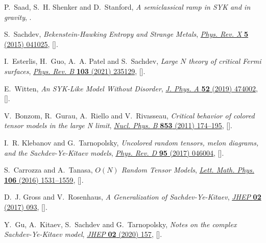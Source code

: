 \begin{thebibliography}{10}
P.~Saad, S.~H. Shenker and D.~Stanford, \emph{{A semiclassical ramp in SYK and
  in gravity}},  \href{https://arxiv.org/abs/1806.06840}{{}}.

S.~Sachdev, \emph{{Bekenstein-Hawking Entropy and Strange Metals}},
  \href{http://dx.doi.org/10.1103/PhysRevX.5.041025}{\emph{Phys. Rev. X}
  {\bfseries 5} (2015) 041025},
  [\href{https://arxiv.org/abs/1506.05111}{{}}].

I.~Esterlis, H.~Guo, A.~A. Patel and S.~Sachdev, \emph{{Large $N$ theory of
  critical Fermi surfaces}},
  \href{http://dx.doi.org/10.1103/PhysRevB.103.235129}{\emph{Phys. Rev. B}
  {\bfseries 103} (2021) 235129},
  [\href{https://arxiv.org/abs/2103.08615}{{}}].

E.~Witten, \emph{{An SYK-Like Model Without Disorder}},
  \href{http://dx.doi.org/10.1088/1751-8121/ab3752}{\emph{J. Phys. A}
  {\bfseries 52} (2019) 474002},
  [\href{https://arxiv.org/abs/1610.09758}{{}}].

V.~Bonzom, R.~Gurau, A.~Riello and V.~Rivasseau, \emph{{Critical behavior of
  colored tensor models in the large N limit}},
  \href{http://dx.doi.org/10.1016/j.nuclphysb.2011.07.022}{\emph{Nucl. Phys. B}
  {\bfseries 853} (2011) 174--195},
  [\href{https://arxiv.org/abs/1105.3122}{{}}].

I.~R. Klebanov and G.~Tarnopolsky, \emph{{Uncolored random tensors, melon
  diagrams, and the Sachdev-Ye-Kitaev models}},
  \href{http://dx.doi.org/10.1103/PhysRevD.95.046004}{\emph{Phys. Rev. D}
  {\bfseries 95} (2017) 046004},
  [\href{https://arxiv.org/abs/1611.08915}{{}}].

S.~Carrozza and A.~Tanasa, \emph{{$O(N)$ Random Tensor Models}},
  \href{http://dx.doi.org/10.1007/s11005-016-0879-x}{\emph{Lett. Math. Phys.}
  {\bfseries 106} (2016) 1531--1559},
  [\href{https://arxiv.org/abs/1512.06718}{{}}].

D.~J. Gross and V.~Rosenhaus, \emph{{A Generalization of Sachdev-Ye-Kitaev}},
  \href{http://dx.doi.org/10.1007/JHEP02(2017)093}{\emph{JHEP} {\bfseries 02}
  (2017) 093}, [\href{https://arxiv.org/abs/1610.01569}{{}}].

Y.~Gu, A.~Kitaev, S.~Sachdev and G.~Tarnopolsky, \emph{{Notes on the complex
  Sachdev-Ye-Kitaev model}},
  \href{http://dx.doi.org/10.1007/JHEP02(2020)157}{\emph{JHEP} {\bfseries 02}
  (2020) 157}, [\href{https://arxiv.org/abs/1910.14099}{{}}].


\end{thebibliography}
